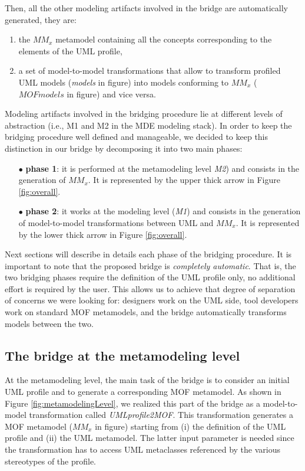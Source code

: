Then, all the other modeling artifacts involved in the bridge are automatically generated, they are:
\begin{enumerate}
	\item the $MM_x$ metamodel containing all the concepts corresponding to the elements of the UML profile,
	\item a set of model-to-model transformations that allow to transform profiled UML models (\textit{models} in figure) into models
conforming to $MM_x$ ($MOF models$ in figure) and vice versa.
\end{enumerate}
%
Modeling artifacts involved in the bridging procedure lie at different levels of abstraction  
(i.e., M1 and M2 in the MDE modeling stack). In order to keep the bridging procedure well defined and manageable,
we decided to keep this distinction in our bridge by decomposing it into two main phases: 
%
\begin{itemize}
	\item[$\bullet$] \textbf{phase 1}: it is performed at the metamodeling level \textit{M2}) and consists in the generation of $MM_x$.
	It is represented by the upper thick arrow in Figure \ref{fig:overall}. 
	\item[$\bullet$] \textbf{phase 2}: it works at the modeling level (\textit{M1}) and consists in the generation of model-to-model 
	transformations between UML and $MM_x$. It is represented by the lower thick arrow in Figure \ref{fig:overall}.
\end{itemize}
%
Next sections will describe in details each phase of the bridging procedure.
It is important to note that the proposed bridge is \textit{completely automatic}. That is, the two bridging phases require 
the definition of the UML profile only, no additional effort is required by the user. This allows us to achieve
that degree of separation of concerns we were looking for: designers work on the UML side, tool developers work on standard MOF metamodels,
and the bridge automatically transforms models between the two.


\subsection{The bridge at the metamodeling level}\label{sec:metamodelLevel}
At the metamodeling level, the main task of the bridge is to consider an initial UML profile and to generate a corresponding MOF metamodel.
As shown in Figure \ref{fig:metamodelingLevel}, we realized this part of the bridge as a model-to-model transformation called 
\textit{UMLprofile2MOF}. This transformation generates a MOF metamodel ($MM_x$ in figure) starting from (i) the definition of the UML profile and (ii) the UML metamodel. The latter input parameter is needed since the transformation has to access UML metaclasses referenced by the 
various stereotypes of the profile.

